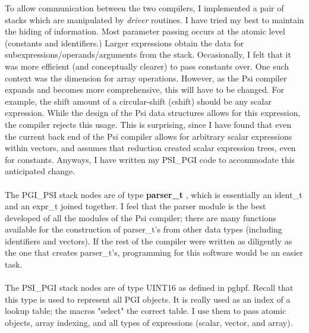\begin{itemize}
  To allow communication between the two compilers, I implemented
  a pair of stacks which are manipulated by {\em driver }  routines.
  I have tried my best to maintain the hiding of information.  Most
  parameter passing occurs at the atomic level (constants and identifiers.)
  Larger expressions obtain the data for subexpressions/operands/arguments
  from the stack.
  Occasionally, I felt that it was more efficient (and conceptually
  clearer) to pass constants over.  One such context was the dimension
  for array operations.  However, as the Psi compiler expands and becomes
  more comprehensive, this will have to be changed.  For example, the
  shift amount of a circular-shift (cshift) should be any scalar expression.
  While the design of the Psi data structures allows for this expression,
  the compiler rejects this usage.  This is surprising, since I have found
  that even the current back end of the Psi compiler allows for arbitrary
  scalar expressions within vectors, and assumes that reduction created
  scalar expression trees, even for constants.  Anyways, I have
  written my PSI_PGI code to accommodate this anticipated change.\\ \\

  The PGI_PSI stack nodes are of type {\bf parser_t } , which is essentially
  an ident_t and an expr_t joined together.  I feel that the parser module
  is the best developed of all the modules of the Psi compiler; there are
  many functions available for the construction of parser_t's from other
  data types (including identifiers and vectors).  If the rest of the
  compiler were written as diligently as the one that creates parser_t's,
  programming for this software would be an easier task.\\ \\

  The PSI_PGI stack nodes are of type UINT16 as defined in pghpf.  Recall
  that this type is used to represent all PGI objects.  It is really
  used as an index of a lookup table; the macros "select" the correct
  table.  I use them to pass atomic objects, array indexing, and all
  types of expressions (scalar, vector, and array).\\ \\ 
\end{itemize} 

